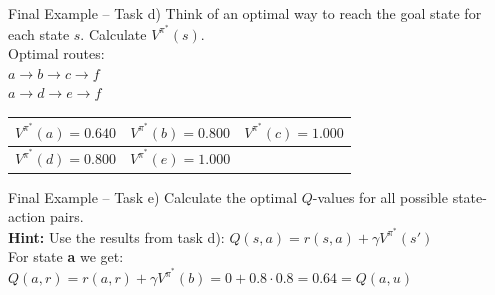 \begin{frame}{Final Example -- Task d)}{}
	Think of an optimal way to reach the goal state for each state $s$. Calculate $V^{\pi^*}(s)$. \\[5mm]
	
	Optimal routes: \\
	$a \longrightarrow b \longrightarrow c \longrightarrow f$ \\
	$a \longrightarrow d \longrightarrow e \longrightarrow f$

	\begin{table}
		\centering
		\begin{tabular}{| c | c | c |}
			\hline
			$V^{\pi^*}(a) = 0.640$		& 	$V^{\pi^*}(b) = 0.800$ 	&	$V^{\pi^*}(c) = 1.000$ 	\\ \hline
			$V^{\pi^*}(d) = 0.800$		&	$V^{\pi^*}(e) = 1.000$	&						\\ \hline
		\end{tabular}
	\end{table}
\end{frame}


\begin{frame}{Final Example -- Task e)}{}
	Calculate the optimal $Q$-values for all possible state-action pairs. \\[5mm]
	
	\textbf{Hint:} Use the results from task d): $Q(s, a) = r(s, a) + \gamma V^{\pi^*}(s')$ \\[5mm]
	
	For state \textbf{a} we get: \\
	$Q(a, r) = r(a, r) + \gamma V^{\pi^*}(b) = 0 + 0.8 \cdot 0.8 = 0.64 = Q(a, u)$
	
	\begin{table}
		\centering
	\end{table}
\end{frame}


